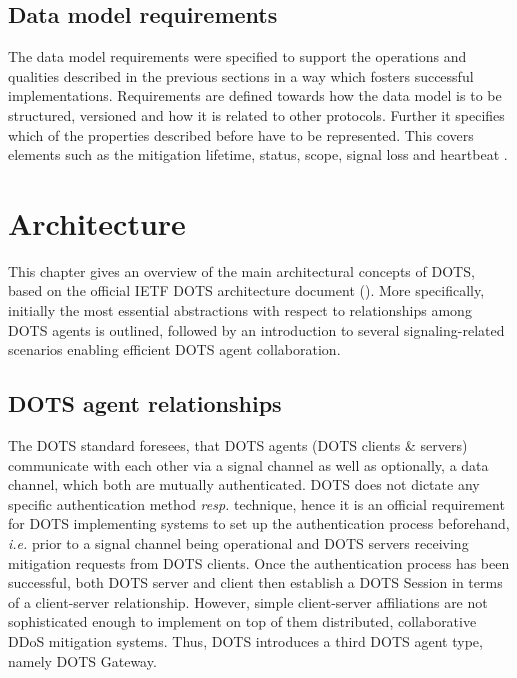 \subsection{Data model requirements}
The data model requirements were specified to support the operations and qualities described in the previous sections in a way which fosters successful implementations.
Requirements are defined towards how the data model is to be structured, versioned and how it is related to other protocols. Further it specifies which of the properties described before have to be represented. This covers elements such as the mitigation lifetime, status, scope, signal loss and heartbeat \cite{rfc8612}.

\section{Architecture}

This chapter gives an overview of the main architectural concepts of DOTS, based on the official IETF DOTS architecture document (\cite{dots-architecture}). More specifically, initially the most essential abstractions with respect to relationships among DOTS agents is outlined, followed by an introduction to several signaling-related scenarios enabling efficient DOTS agent collaboration.

\subsection{DOTS agent relationships}
The DOTS standard foresees, that DOTS agents (DOTS clients \& servers) communicate with each other via a signal channel as well as optionally, a data channel, which both are mutually authenticated. DOTS does not dictate any specific authentication method \emph{resp.} technique, hence it is an official requirement for DOTS implementing systems to set up the authentication process beforehand, \emph{i.e.} prior to a signal channel being operational and DOTS servers receiving mitigation requests from DOTS clients. Once the authentication process has been successful, both DOTS server and client then establish a DOTS Session in terms of a client-server relationship. However, simple client-server affiliations are not sophisticated enough to implement on top of them distributed, collaborative DDoS mitigation systems. Thus, DOTS introduces a third DOTS agent type, namely DOTS Gateway.

